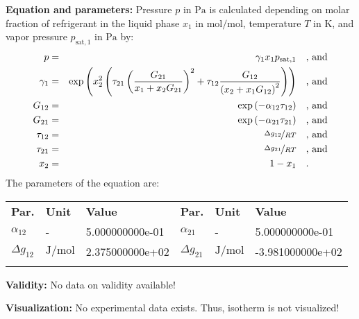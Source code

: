\textbf{Equation and parameters:}
\newline
%
Pressure $p$ in $\si{\pascal}$ is calculated depending on molar fraction of refrigerant in the liquid phase $x_1$ in $\si{\mole\per\mole}$, temperature $T$ in $\si{\kelvin}$, and vapor pressure $p_\mathrm{sat,1}$ in $\si{\pascal}$ by:
%
\begin{equation*}
\begin{split}
p &=& \gamma_1 x_1 p_\mathrm{sat,1} & \quad\text{, and} \\
\gamma_1 &=& \exp \left( x_2^2 \left( \tau_{21} \left( \frac{G_{21}}{x_1 + x_2 G_{21}} \right) ^2 + \tau_{12} \frac{G_{12}}{\left( x_2 + x_1 G_{12} \right) ^2}\right) \right) & \quad\text{, and} \\
G_{12} &=& \exp \left( -\alpha_{12} \tau_{12} \right) & \quad\text{, and} \\
G_{21} &=& \exp \left( -\alpha_{21} \tau_{21} \right) & \quad\text{, and} \\
\tau_{12} &=& \nicefrac{\Delta g_{12}}{R T} & \quad\text{, and} \\
\tau_{21} &=& \nicefrac{\Delta g_{21}}{R T} & \quad\text{, and} \\
x_2 &=& 1 - x_1  & \quad\text{.} \\
\end{split}
\end{equation*}
%
The parameters of the equation are:
%
\begin{longtable}[l]{lll|lll}
\toprule
\addlinespace
\textbf{Par.} & \textbf{Unit} & \textbf{Value} &	\textbf{Par.} & \textbf{Unit} & \textbf{Value} \\
\addlinespace
\midrule
\endhead

\bottomrule
\endfoot
\bottomrule
\endlastfoot
\addlinespace

$\alpha_{12}$ & - & 5.000000000e-01 & $\alpha_{21}$ & - & 5.000000000e-01 \\
$\Delta g_{12}$ & $\si{\joule\per\mole}$ & 2.375000000e+02 & $\Delta g_{21}$ & $\si{\joule\per\mole}$ & -3.981000000e+02 \\

\addlinespace\end{longtable}

\textbf{Validity:}
\newline
No data on validity available!
\newline

\textbf{Visualization:}
%
\newline
No experimental data exists. Thus, isotherm is not visualized!
%

